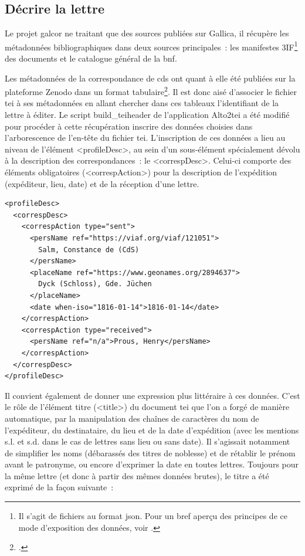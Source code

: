 \documentclass[a4paper,12pt,twoside]{book}
\begin{document}
			\subsection{Décrire la lettre}
				Le projet \gls{galcor} ne traitant que des sources publiées sur Gallica, il récupère les métadonnées bibliographiques dans deux sources principales~: les manifestes 3IF\footnote{Il s'agit de fichiers au format \gls{json}. Pour un bref aperçu des principes de ce mode d'exposition des données, voir \cite{robineauComprendreIIIFInteroperabilite2016}.} des documents et le catalogue général de la \gls{bnf}.
				
				Les métadonnées de la correspondance de \gls{cds} ont quant à elle été publiées sur la plateforme Zenodo dans un format tabulaire\footcite{peyronnetdrydenInventarKorrespondenzConstance2021}. Il est donc aisé d'associer le fichier \gls{tei} à ses métadonnées en allant chercher dans ces tableaux l'identifiant de la lettre à éditer. Le script \textsf{build\_teiheader} de l'application Alto2tei a été modifié pour procéder à cette récupération inscrire des données choisies dans l'arborescence de l'en-tête du fichier \gls{tei}. L'inscription de ces données a lieu au niveau de l'élément \textsf{<profileDesc>}, au sein d'un sous-élément spécialement dévolu à la description des correspondances~: le \textsf{<correspDesc>}. Celui-ci comporte des éléments obligatoires (\textsf{<correspAction>}) pour la description de l'expédition (expéditeur, lieu, date) et de la réception d'une lettre.
				
				\small
				\begin{verbatim}
<profileDesc>
  <correspDesc>
    <correspAction type="sent">
      <persName ref="https://viaf.org/viaf/121051">
        Salm, Constance de (CdS)
      </persName>
      <placeName ref="https://www.geonames.org/2894637">
        Dyck (Schloss), Gde. Jüchen
      </placeName>
      <date when-iso="1816-01-14">1816-01-14</date>
    </correspAction>
    <correspAction type="received">
      <persName ref="n/a">Prous, Henry</persName>
    </correspAction>
  </correspDesc>
</profileDesc>
				\end{verbatim}
				\normalsize
			
				Il convient également de donner une expression plus littéraire à ces données. C'est le rôle de l'élément titre (\textsf{<title>}) du document \gls{tei} que l'on a forgé de manière automatique, par la manipulation des chaînes de caractères du nom de l'expéditeur, du destinataire, du lieu et de la date d'expédition (avec les mentions s.l. et s.d. dans le cas de lettres sans lieu ou sans date). Il s'agissait notamment de simplifier les noms (débarassés des titres de noblesse) et de rétablir le prénom avant le patronyme, ou encore d'exprimer la date en toutes lettres. Toujours pour la même lettre (et donc à partir des mêmes données brutes), le titre a été exprimé de la façon suivante~:
				
\end{document}
